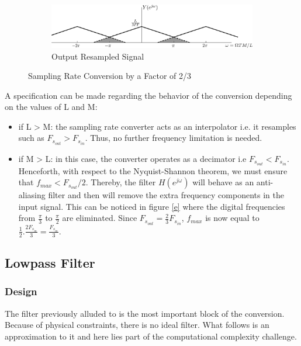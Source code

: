 \begin{figure}[H]
\par\bigskip
\centering
\begin{subfigure}[b]{\textwidth}
	\centering
	\includegraphics[scale=1]{DTFT_resampler_f.png}
	\caption{Output Resampled Signal}\label{f}
\end{subfigure}
		\caption{Sampling Rate Conversion by a Factor of 2/3}\label{Figure 3.4}
\end{figure}

A specification can be made regarding the behavior of the conversion depending on the values of L and M:

\begin{itemize}
	\item if L > M: the sampling rate converter acts as an interpolator i.e. it resamples such as $F_{s_{out}} > F_{s_{in}}$. Thus, no further frequency limitation is needed.
	\item if M > L: in this case, the converter operates as a decimator i.e $F_{s_{out}} < F_{s_{in}}$. Henceforth, with respect to the Nyquist-Shannon theorem, we must ensure that $f_{max} < F_{s_{out}}/2$. Thereby, the filter $H(e^{j\omega})$ will behave as an anti-aliasing filter and then will remove the extra frequency components in the input signal. This can be noticed in figure \ref{e} where the digital frequencies from $\frac{\pi}{3}$ to $\frac{\pi}{2}$ are eliminated. Since $F_{s_{out}} = \frac{2}{3} F_{s_{in}}$, $f_{max}$ is now equal to $\frac{1}{2}.\frac{2F_{s_{in}}}{3} = \frac{F_{s_{in}}}{3}$.
\end{itemize}


\subsection{Lowpass Filter}\label{section 3.1.3}

\subsubsection{Design}

The filter previously alluded to is the most important block of the conversion. Because of physical constraints, there is no ideal filter. What follows is an approximation to it and here lies part of the computational complexity challenge.

